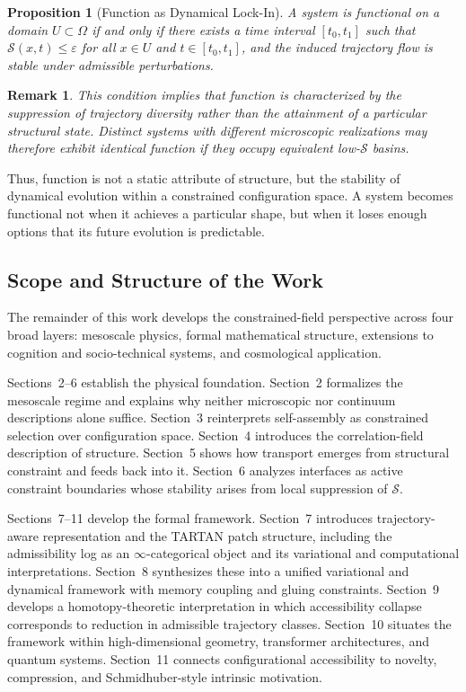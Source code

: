 \documentclass[11pt, a4paper, twocolumn]{article}
\newtheorem{proposition}[definition]{Proposition}
\newtheorem{remark}[definition]{Remark}
\newcommand{\Sfield}{\mathcal{S}}
\begin{document}
\begin{proposition}[Function as Dynamical Lock-In]
A system is functional on a domain $U \subset \Omega$ if and only if there
exists a time interval $[t_0,t_1]$ such that
$\Sfield(x,t) \leq \varepsilon$ for all $x \in U$ and $t \in [t_0,t_1]$,
and the induced trajectory flow is stable under admissible perturbations.
\end{proposition}

\begin{remark}
This condition implies that function is characterized by the suppression of
trajectory diversity rather than the attainment of a particular structural
state. Distinct systems with different microscopic realizations may therefore
exhibit identical function if they occupy equivalent low-$\Sfield$ basins.
\end{remark}

Thus, function is not a static attribute of structure, but the stability of
dynamical evolution within a constrained configuration space. A system becomes
functional not when it achieves a particular shape, but when it loses enough
options that its future evolution is predictable.

\subsection{Scope and Structure of the Work}

The remainder of this work develops the constrained-field perspective across
four broad layers: mesoscale physics, formal mathematical structure, extensions
to cognition and socio-technical systems, and cosmological application.

Sections~2--6 establish the physical foundation. Section~2 formalizes the
mesoscale regime and explains why neither microscopic nor continuum descriptions
alone suffice. Section~3 reinterprets self-assembly as constrained selection over
configuration space. Section~4 introduces the correlation-field description of
structure. Section~5 shows how transport emerges from structural constraint and
feeds back into it. Section~6 analyzes interfaces as active constraint boundaries
whose stability arises from local suppression of $\Sfield$.

Sections~7--11 develop the formal framework. Section~7 introduces
trajectory-aware representation and the TARTAN patch structure, including the
admissibility log as an $\infty$-categorical object and its variational and
computational interpretations. Section~8 synthesizes these into a unified
variational and dynamical framework with memory coupling and gluing constraints.
Section~9 develops a homotopy-theoretic interpretation in which accessibility
collapse corresponds to reduction in admissible trajectory classes. Section~10
situates the framework within high-dimensional geometry, transformer architectures,
and quantum systems. Section~11 connects configurational accessibility to novelty,
compression, and Schmidhuber-style intrinsic motivation.
\end{document}
